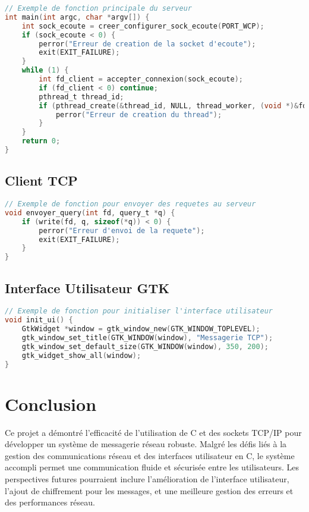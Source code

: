 \documentclass{article}
\begin{document}
\begin{lstlisting}[language=C]
// Exemple de fonction principale du serveur
int main(int argc, char *argv[]) {
    int sock_ecoute = creer_configurer_sock_ecoute(PORT_WCP);
    if (sock_ecoute < 0) {
        perror("Erreur de creation de la socket d'ecoute");
        exit(EXIT_FAILURE);
    }
    while (1) {
        int fd_client = accepter_connexion(sock_ecoute);
        if (fd_client < 0) continue;
        pthread_t thread_id;
        if (pthread_create(&thread_id, NULL, thread_worker, (void *)&fd_client) != 0) {
            perror("Erreur de creation du thread");
        }
    }
    return 0;
}
\end{lstlisting}

\subsection{Client TCP}

\begin{lstlisting}[language=C]
// Exemple de fonction pour envoyer des requetes au serveur
void envoyer_query(int fd, query_t *q) {
    if (write(fd, q, sizeof(*q)) < 0) {
        perror("Erreur d'envoi de la requete");
        exit(EXIT_FAILURE);
    }
}
\end{lstlisting}

\subsection{Interface Utilisateur GTK}

\begin{lstlisting}[language=C]
// Exemple de fonction pour initialiser l'interface utilisateur
void init_ui() {
    GtkWidget *window = gtk_window_new(GTK_WINDOW_TOPLEVEL);
    gtk_window_set_title(GTK_WINDOW(window), "Messagerie TCP");
    gtk_window_set_default_size(GTK_WINDOW(window), 350, 200);
    gtk_widget_show_all(window);
}
\end{lstlisting}

\section{Conclusion}

Ce projet a démontré l'efficacité de l'utilisation de C et des sockets TCP/IP pour développer un système de messagerie réseau robuste. Malgré les défis liés à la gestion des communications réseau et des interfaces utilisateur en C, le système accompli permet une communication fluide et sécurisée entre les utilisateurs. Les perspectives futures pourraient inclure l'amélioration de l'interface utilisateur, l'ajout de chiffrement pour les messages, et une meilleure gestion des erreurs et des performances réseau.
\end{document}
